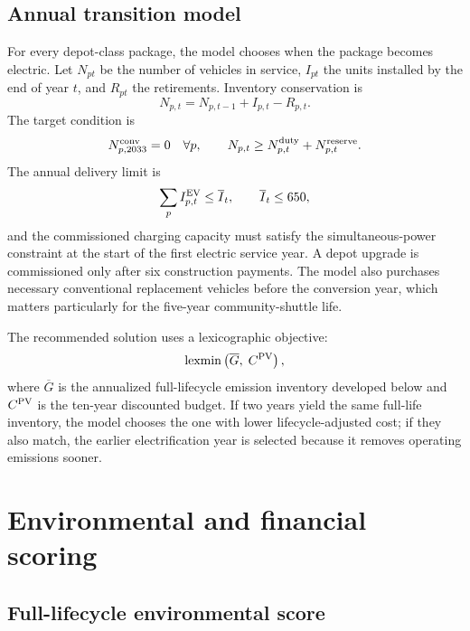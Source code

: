 \documentclass[12pt,letterpaper]{article}
\begin{document}
\subsection{Annual transition model}

For every depot-class package, the model chooses when the package becomes electric. Let $N_{pt}$ be the number of vehicles in service, $I_{pt}$ the units installed by the end of year $t$, and $R_{pt}$ the retirements. Inventory conservation is
\begin{equation}
N_{p,t}=N_{p,t-1}+I_{p,t}-R_{p,t}.
\end{equation}
The target condition is
\begin{equation}
N_{p,2033}^{\rm conv}=0\quad\forall p,\qquad
N_{p,t}\ge N_{p,t}^{\rm duty}+N_{p,t}^{\rm reserve}.
\end{equation}
The annual delivery limit is
\begin{equation}
\sum_p I_{p,t}^{\rm EV}\le \overline I_t,\qquad \overline I_t\le 650,
\end{equation}
and the commissioned charging capacity must satisfy the simultaneous-power constraint at the start of the first electric service year. A depot upgrade is commissioned only after six construction payments. The model also purchases necessary conventional replacement vehicles before the conversion year, which matters particularly for the five-year community-shuttle life.

The recommended solution uses a lexicographic objective:
\begin{equation}
\operatorname{lexmin}\left(\overline G,\;C^{\rm PV}\right),
\end{equation}
where $\overline G$ is the annualized full-lifecycle emission inventory developed below and $C^{\rm PV}$ is the ten-year discounted budget. If two years yield the same full-life inventory, the model chooses the one with lower lifecycle-adjusted cost; if they also match, the earlier electrification year is selected because it removes operating emissions sooner.

\section{Environmental and financial scoring}

\subsection{Full-lifecycle environmental score}
\end{document}
